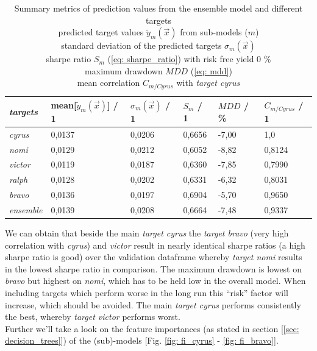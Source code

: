 \documentclass[12pt, a4paper]{article}
\begin{document}
\begin{table}[!htbp]
\centering
\caption{Summary metrics of prediction values from the ensemble model and different targets \\
predicted target values $\tilde{y}_m(\vec{x})$ from sub-models ($m$) \\
standard deviation of the predicted targets $\sigma_m(\vec{x})$ \\
sharpe ratio $S_m$ (\ref{eq: sharpe_ratio}) with risk free yield 0 \% \\
maximum drawdown $MDD$ (\ref{eq: mdd}) \\
mean correlation $C_{m/Cyrus}$ with \textit{target cyrus} \\}
\label{table: summary_metric_predictions_ensemble}
\begin{tabular}{|l|l|l|l|l|l|}
\hline
\textit{targets} & mean[$\tilde{y}_m(\vec{x})$] / 1 & $\sigma_m(\vec{x})$ / 1 & $S_m$ / 1 & $MDD$ / \% & $C_{m/Cyrus}$ / 1 \\ \hline
\hline
\hline
\textit{cyrus} & 0,0137 & 0,0206 & 0,6656 & -7,00 & 1,0  \\ \hline
\textit{nomi} & 0,0129 & 0,0212 & 0,6052 & -8,82 & 0,8124 \\ \hline
\textit{victor} & 0,0119 & 0,0187 & 0,6360 & -7,85 &  0,7990 \\ \hline
\textit{ralph} & 0,0128 & 0,0202 & 0,6331 & -6,32 & 0,8031 \\ \hline
\textit{bravo} & 0,0136 & 0,0197 & 0,6904 & -5,70 & 0,9650 \\ \hline
\hline
\textit{ensemble} & 0,0139 & 0,0208 & 0,6664 & -7,48 & 0,9337 \\ \hline
\end{tabular}
\end{table}
\newpage
We can obtain that beside the main \textit{target cyrus} the \textit{target bravo} (very high correlation with \textit{cyrus}) and \textit{victor} result in nearly identical sharpe ratios (a high sharpe ratio is good) over the validation dataframe whereby \textit{target nomi} results in the lowest sharpe ratio in comparison. The maximum drawdown is lowest on \textit{bravo} but highest on \textit{nomi}, which has to be held low in the overall model.
When including targets which perform worse in the long run this ``risk'' factor will increase, which should be avoided.
The main \textit{target cyrus} performs consistently the best, whereby \textit{target victor} performs worst. \\
Further we'll take a look on the feature importances (as stated in section [\ref{sec: decision_trees}]) of the (sub)-models [Fig. \ref{fig: fi_cyrus} - \ref{fig: fi_bravo}].
\end{document}
